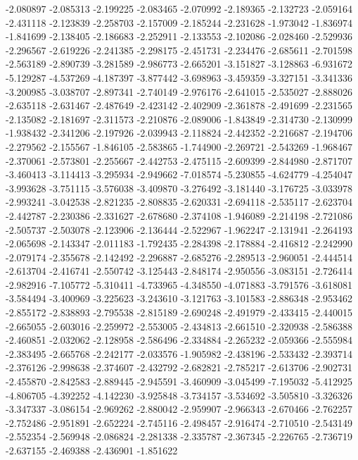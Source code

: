 -2.080897
-2.085313
-2.199225
-2.083465
-2.070992
-2.189365
-2.132723
-2.059164
-2.431118
-2.123839
-2.258703
-2.157009
-2.185244
-2.231628
-1.973042
-1.836974
-1.841699
-2.138405
-2.186683
-2.252911
-2.133553
-2.102086
-2.028460
-2.529936
-2.296567
-2.619226
-2.241385
-2.298175
-2.451731
-2.234476
-2.685611
-2.701598
-2.563189
-2.890739
-3.281589
-2.986773
-2.665201
-3.151827
-3.128863
-6.931672
-5.129287
-4.537269
-4.187397
-3.877442
-3.698963
-3.459359
-3.327151
-3.341336
-3.200985
-3.038707
-2.897341
-2.740149
-2.976176
-2.641015
-2.535027
-2.888026
-2.635118
-2.631467
-2.487649
-2.423142
-2.402909
-2.361878
-2.491699
-2.231565
-2.135082
-2.181697
-2.311573
-2.210876
-2.089006
-1.843849
-2.314730
-2.130999
-1.938432
-2.341206
-2.197926
-2.039943
-2.118824
-2.442352
-2.216687
-2.194706
-2.279562
-2.155567
-1.846105
-2.583865
-1.744900
-2.269721
-2.543269
-1.968467
-2.370061
-2.573801
-2.255667
-2.442753
-2.475115
-2.609399
-2.844980
-2.871707
-3.460413
-3.114413
-3.295934
-2.949662
-7.018574
-5.230855
-4.624779
-4.254047
-3.993628
-3.751115
-3.576038
-3.409870
-3.276492
-3.181440
-3.176725
-3.033978
-2.993241
-3.042538
-2.821235
-2.808835
-2.620331
-2.694118
-2.535117
-2.623704
-2.442787
-2.230386
-2.331627
-2.678680
-2.374108
-1.946089
-2.214198
-2.721086
-2.505737
-2.503078
-2.123906
-2.136444
-2.522967
-1.962247
-2.131941
-2.264193
-2.065698
-2.143347
-2.011183
-1.792435
-2.284398
-2.178884
-2.416812
-2.242990
-2.079174
-2.355678
-2.142492
-2.296887
-2.685276
-2.289513
-2.960051
-2.444514
-2.613704
-2.416741
-2.550742
-3.125443
-2.848174
-2.950556
-3.083151
-2.726414
-2.982916
-7.105772
-5.310411
-4.733965
-4.348550
-4.071883
-3.791576
-3.618081
-3.584494
-3.400969
-3.225623
-3.243610
-3.121763
-3.101583
-2.886348
-2.953462
-2.855172
-2.838893
-2.795538
-2.815189
-2.690248
-2.491979
-2.433415
-2.440015
-2.665055
-2.603016
-2.259972
-2.553005
-2.434813
-2.661510
-2.320938
-2.586388
-2.460851
-2.032062
-2.128958
-2.586496
-2.334884
-2.265232
-2.059366
-2.555984
-2.383495
-2.665768
-2.242177
-2.033576
-1.905982
-2.438196
-2.533432
-2.393714
-2.376126
-2.998638
-2.374607
-2.432792
-2.682821
-2.785217
-2.613706
-2.902731
-2.455870
-2.842583
-2.889445
-2.945591
-3.460909
-3.045499
-7.195032
-5.412925
-4.806705
-4.392252
-4.142230
-3.925848
-3.734157
-3.534692
-3.505810
-3.326326
-3.347337
-3.086154
-2.969262
-2.880042
-2.959907
-2.966343
-2.670466
-2.762257
-2.752486
-2.951891
-2.652224
-2.745116
-2.498457
-2.916474
-2.710510
-2.543149
-2.552354
-2.569948
-2.086824
-2.281338
-2.335787
-2.367345
-2.226765
-2.736719
-2.637155
-2.469388
-2.436901
-1.851622
